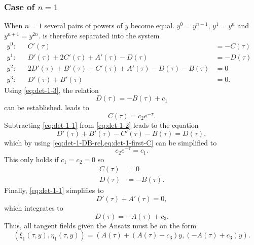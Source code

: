 \subsubsection{Case of \texorpdfstring{\(n=1\)}{n is 1}}

When \(n=1\) several pairs of powers of \(y\) become equal.
\(y^0 = y^{n-1}\), \(y^1 = y^n\) and \(y^{n+1} = y^{2n}\).
 is therefore separated into the system
\begin{subequations}
  \begin{flalign}
    y^0:  && C'(\tau) &= -C(\tau) &\label{eq:det-1-0}\\
    y^1:  && D'(\tau) + 2C'(\tau) + A'(\tau) - D(\tau) &= -D(\tau) &\label{eq:det-1-1}\\
    y^2:  && 2D'(\tau) + B'(\tau) + C'(\tau) + A'(\tau) - D(\tau) - B(\tau) &= 0 &\label{eq:det-1-2}\\
    y^3:  && D'(\tau) + B'(\tau) &= 0. &\label{eq:det-1-3}
  \end{flalign}
\end{subequations}
Using \cref{eq:det-1-3}, the relation
\begin{equation} \label{eq:det-1-DB-rel}
  D(\tau) = - B(\tau) + c_1
\end{equation}
can be established.
 leads to
\begin{equation} \label{eq:det-1-first-C}
  C(\tau) = c_2 e^{-\tau}.
\end{equation}
Subtracting \cref{eq:det-1-1} from \cref{eq:det-1-2} leads to the equation
\begin{equation*}
  D'(\tau) + B'(\tau) - C'(\tau) - B(\tau) = D(\tau),
\end{equation*}
which by using \cref{eq:det-1-DB-rel,eq:det-1-first-C} can be simplified to
\begin{equation*}
  c_2 e^{-\tau} = c_1.
\end{equation*}
This only holds if \(c_1 = c_2 = 0\) so
\begin{align}
  C(\tau) &= 0 \\
  D(\tau) &= - B(\tau).
\end{align}
Finally, \cref{eq:det-1-1} simplifies to
\begin{equation*}
  D'(\tau) + A'(\tau) = 0,
\end{equation*}
which integrates to
\begin{equation*}
  D(\tau) = - A(\tau) + c_3.
\end{equation*}
Thus, all tangent fields given the Ansatz must be on the form
\begin{equation} \label{eq:hill-tangent-field-1}
  \left(\xi_1(\tau,y),\eta_1(\tau,y)\right) = 
  \left(A(\tau) + \left( A(\tau) - c_3 \right) y, \left( -A(\tau) + c_3 \right) y\right).
\end{equation}

